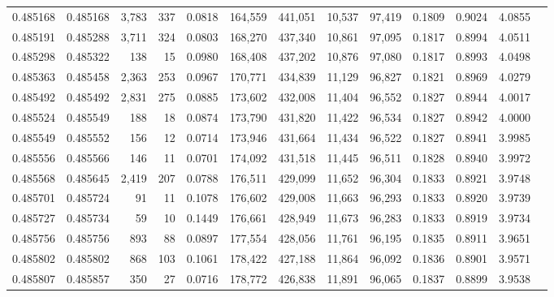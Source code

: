 \begin{tabular}{rrrrrrrrrrrrr}
0.485168 & 0.485168 & 3,783 &   337 &                                     0.0818 & 164,559 & 441,051 &  10,537 &  97,419 & 0.1809 & 0.9024 & 4.0855 \\
0.485191 & 0.485288 & 3,711 &   324 &                                     0.0803 & 168,270 & 437,340 &  10,861 &  97,095 & 0.1817 & 0.8994 & 4.0511 \\
0.485298 & 0.485322 &   138 &    15 &                                     0.0980 & 168,408 & 437,202 &  10,876 &  97,080 & 0.1817 & 0.8993 & 4.0498 \\
0.485363 & 0.485458 & 2,363 &   253 &                                     0.0967 & 170,771 & 434,839 &  11,129 &  96,827 & 0.1821 & 0.8969 & 4.0279 \\
0.485492 & 0.485492 & 2,831 &   275 &                                     0.0885 & 173,602 & 432,008 &  11,404 &  96,552 & 0.1827 & 0.8944 & 4.0017 \\
0.485524 & 0.485549 &   188 &    18 &                                     0.0874 & 173,790 & 431,820 &  11,422 &  96,534 & 0.1827 & 0.8942 & 4.0000 \\
0.485549 & 0.485552 &   156 &    12 &                                     0.0714 & 173,946 & 431,664 &  11,434 &  96,522 & 0.1827 & 0.8941 & 3.9985 \\
0.485556 & 0.485566 &   146 &    11 &                                     0.0701 & 174,092 & 431,518 &  11,445 &  96,511 & 0.1828 & 0.8940 & 3.9972 \\
0.485568 & 0.485645 & 2,419 &   207 &                                     0.0788 & 176,511 & 429,099 &  11,652 &  96,304 & 0.1833 & 0.8921 & 3.9748 \\
0.485701 & 0.485724 &    91 &    11 &                                     0.1078 & 176,602 & 429,008 &  11,663 &  96,293 & 0.1833 & 0.8920 & 3.9739 \\
0.485727 & 0.485734 &    59 &    10 &                                     0.1449 & 176,661 & 428,949 &  11,673 &  96,283 & 0.1833 & 0.8919 & 3.9734 \\
0.485756 & 0.485756 &   893 &    88 &                                     0.0897 & 177,554 & 428,056 &  11,761 &  96,195 & 0.1835 & 0.8911 & 3.9651 \\
0.485802 & 0.485802 &   868 &   103 &                                     0.1061 & 178,422 & 427,188 &  11,864 &  96,092 & 0.1836 & 0.8901 & 3.9571 \\
0.485807 & 0.485857 &   350 &    27 &                                     0.0716 & 178,772 & 426,838 &  11,891 &  96,065 & 0.1837 & 0.8899 & 3.9538 \\

\end{tabular}
